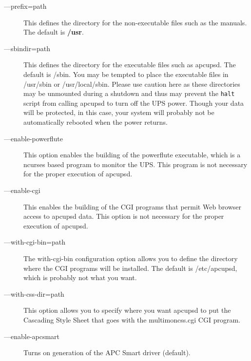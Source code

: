 \begin{description}

\item [{---}prefix=\lt{}path\gt{}]
   This defines the directory for the non-executable files such as the manuals.
The default is {\bf /usr}.  

\label{index-options_002c-_002d_002d_002dsbindir-27}

\item [{---}sbindir=\lt{}path\gt{}]
   This defines the directory for the executable files such as apcupsd. The
default is /sbin. You may be tempted to place the executable files in
/usr/sbin or /usr/local/sbin. Please use caution here as these directories may
be unmounted during a shutdown and thus may prevent the {\tt halt} script from
calling apcupsd to turn off the UPS power. Though your data will be protected,
in this case, your system will probably not be automatically rebooted when the
power returns.  

\label{index-options_002c-_002d_002d_002denable_002dpowerflute-28}

\item [{---}enable-powerflute]
   This option enables the building of the powerflute executable, which is a
ncurses based program to monitor the UPS. This program is not necessary for
the proper execution of apcupsd.  

\label{index-options_002c-_002d_002d_002denable_002dcgi-29}

\item [{---}enable-cgi]
   This enables the building of the CGI programs that permit Web browser access
to apcupsd data. This option is not necessary for the proper execution of
apcupsd.  

\item [{---}with-cgi-bin=\lt{}path\gt{}]
   The with-cgi-bin configuration option allows you to define the directory where
the CGI programs will be installed. The default is /etc/apcupsd, which is
probably not what you want.  

\item [{---}with-css-dir=\lt{}path\gt{}]
   This option allows you to specify where you want apcupsd to put the Cascading
Style Sheet that goes with the multimoncss.cgi CGI program.  

\item [{---}enable-apcsmart]
   Turns on generation of the APC Smart driver (default).  


\end{description}
